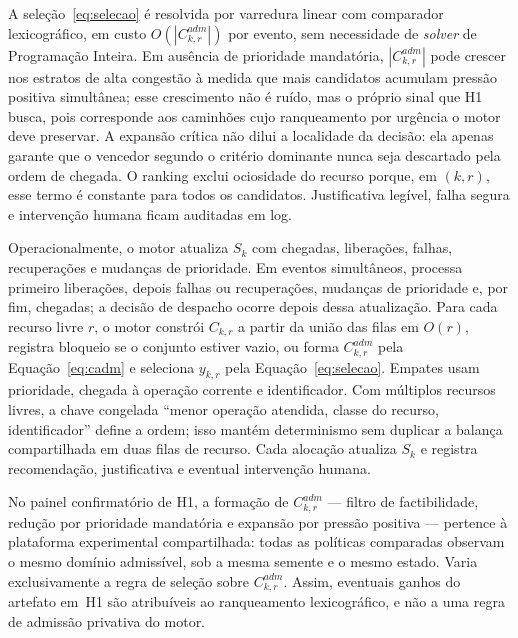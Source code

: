 \documentclass[
  12pt,
  oneside,
  a4paper,
  sumario=tradicional,
  brazil
]{abntex2}
\begin{document}
A sele\c{c}\~ao~\eqref{eq:selecao} \'e resolvida por varredura linear com comparador lexicogr\'afico, em custo $O(|C^{adm}_{k,r}|)$ por evento, sem necessidade de \emph{solver} de Programa\c{c}\~ao Inteira. Em aus\^encia de prioridade mandat\'oria, $|C^{adm}_{k,r}|$ pode crescer nos estratos de alta congest\~ao \`a medida que mais candidatos acumulam press\~ao positiva simult\^anea; esse crescimento n\~ao \'e ru\'ido, mas o pr\'oprio sinal que H1 busca, pois corresponde aos caminh\~oes cujo ranqueamento por urg\^encia o motor deve preservar. A expans\~ao cr\'itica n\~ao dilui a localidade da decis\~ao: ela apenas garante que o vencedor segundo o crit\'erio dominante nunca seja descartado pela ordem de chegada. O ranking exclui ociosidade do recurso porque, em $(k,r)$, esse termo \'e constante para todos os candidatos. Justificativa leg\'ivel, falha segura e interven\c{c}\~ao humana ficam auditadas em log.

Operacionalmente, o motor atualiza $S_k$ com chegadas, libera\c{c}\~oes, falhas, recupera\c{c}\~oes e mudan\c{c}as de prioridade. Em eventos simult\^aneos, processa primeiro libera\c{c}\~oes, depois falhas ou recupera\c{c}\~oes, mudan\c{c}as de prioridade e, por fim, chegadas; a decis\~ao de despacho ocorre depois dessa atualiza\c{c}\~ao. Para cada recurso livre $r$, o motor constr\'oi $C_{k,r}$ a partir da uni\~ao das filas em $O(r)$, registra bloqueio se o conjunto estiver vazio, ou forma $C^{adm}_{k,r}$ pela Equa\c{c}\~ao~\eqref{eq:cadm} e seleciona $y_{k,r}$ pela Equa\c{c}\~ao~\eqref{eq:selecao}. Empates usam prioridade, chegada \`a opera\c{c}\~ao corrente e identificador. Com m\'ultiplos recursos livres, a chave congelada ``menor opera\c{c}\~ao atendida, classe do recurso, identificador'' define a ordem; isso mant\'em determinismo sem duplicar a balan\c{c}a compartilhada em duas filas de recurso. Cada aloca\c{c}\~ao atualiza $S_k$ e registra recomenda\c{c}\~ao, justificativa e eventual interven\c{c}\~ao humana.

No painel confirmat\'orio de H1, a forma\c{c}\~ao de $C^{adm}_{k,r}$ --- filtro de factibilidade, redu\c{c}\~ao por prioridade mandat\'oria e expans\~ao por press\~ao positiva --- pertence \`a plataforma experimental compartilhada: todas as pol\'iticas comparadas observam o mesmo dom\'inio admiss\'ivel, sob a mesma semente e o mesmo estado. Varia exclusivamente a regra de sele\c{c}\~ao sobre $C^{adm}_{k,r}$. Assim, eventuais ganhos do artefato em~H1 s\~ao atribu\'iveis ao ranqueamento lexicogr\'afico, e n\~ao a uma regra de admiss\~ao privativa do motor.
\end{document}
